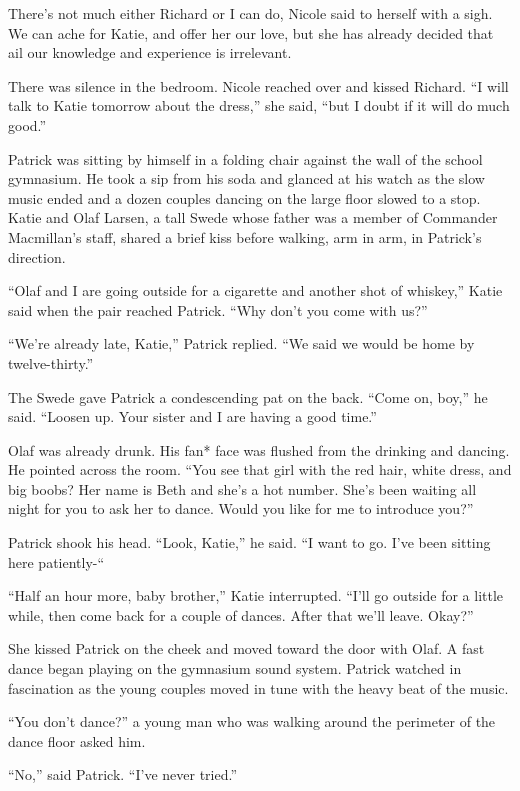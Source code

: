 \documentclass[]{article}
\begin{document}
{There’s not much either Richard or I can do, Nicole said to herself with a sigh.  We can ache for Katie, and offer her our love, but she has already decided that ail our knowledge and experience is irrelevant.

There was silence in the bedroom.  Nicole reached over and kissed Richard.  “I will talk to Katie tomorrow about the dress,” she said, “but I doubt if it will do much good.”

Patrick was sitting by himself in a folding chair against the wall of the school gymnasium.  He took a sip from his soda and glanced at his watch as the slow music ended and a dozen couples dancing on the large floor slowed to a stop.  Katie and Olaf Larsen, a tall Swede whose father was a member of Commander Macmillan’s staff, shared a brief kiss before walking, arm in arm, in Patrick’s direction.

“Olaf and I are going outside for a cigarette and another shot of whiskey,” Katie said when the pair reached Patrick.  “Why don’t you come with us?”

“We’re already late, Katie,” Patrick replied.  “We said we would be home by twelve-thirty.”

The Swede gave Patrick a condescending pat on the back.  “Come on, boy,” he said.  “Loosen up.  Your sister and I are having a good time.”

Olaf was already drunk.  His fan* face was flushed from the drinking and dancing.  He pointed across the room.  “You see that girl with the red hair, white dress, and big boobs? Her name is Beth and she’s a hot number.  She’s been waiting all night for you to ask her to dance.  Would you like for me to introduce you?”

Patrick shook his head.  “Look, Katie,” he said.  “I want to go.  I’ve been sitting here patiently-“

“Half an hour more, baby brother,” Katie interrupted.  “I’ll go outside for a little while, then come back for a couple of dances.  After that we’ll leave.  Okay?”

She kissed Patrick on the cheek and moved toward the door with Olaf.  A fast dance began playing on the gymnasium sound system.  Patrick watched in fascination as the young couples moved in tune with the heavy beat of the music.

“You don’t dance?” a young man who was walking around the perimeter of the dance floor asked him.

“No,” said Patrick.  “I’ve never tried.”

}
\end{document}
